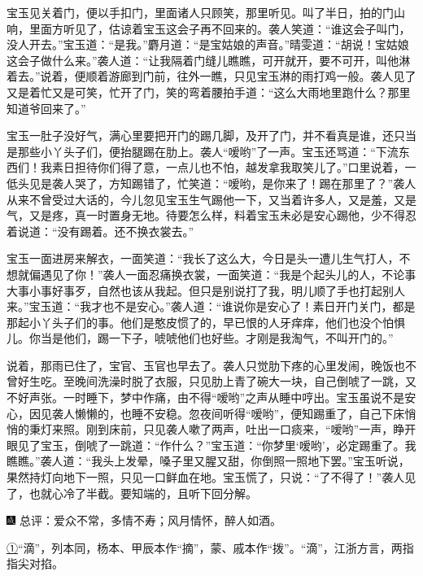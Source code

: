 宝玉见关着门，便以手扣门，里面诸人只顾笑，那里听见。叫了半日，拍的门山响，里面方听见了，估谅着宝玉这会子再不回来的。袭人笑道：``谁这会子叫门，没人开去。''宝玉道：``是我。''麝月道：``是宝姑娘的声音。''晴雯道：``胡说！宝姑娘这会子做什么来。''袭人道：``让我隔着门缝儿瞧瞧，可开就开，要不可开，叫他淋着去。''说着，便顺着游廊到门前，往外一瞧，只见宝玉淋的雨打鸡一般。袭人见了又是着忙又是可笑，忙开了门，笑的弯着腰拍手道：``这么大雨地里跑什么？那里知道爷回来了。''

宝玉一肚子没好气，满心里要把开门的踢几脚，及开了门，并不看真是谁，还只当是那些小丫头子们，便抬腿踢在肋上。袭人``嗳哟''了一声。宝玉还骂道：``下流东西们！我素日担待你们得了意，一点儿也不怕，越发拿我取笑儿了。''口里说着，一低头见是袭人哭了，方知踢错了，忙笑道：``嗳哟，是你来了！踢在那里了？''袭人从来不曾受过大话的，今儿忽见宝玉生气踢他一下，又当着许多人，又是羞，又是气，又是疼，真一时置身无地。待要怎么样，料着宝玉未必是安心踢他，少不得忍着说道：``没有踢着。还不换衣裳去。''

宝玉一面进房来解衣，一面笑道：``我长了这么大，今日是头一遭儿生气打人，不想就偏遇见了你！''袭人一面忍痛换衣裳，一面笑道：``我是个起头儿的人，不论事大事小事好事歹，自然也该从我起。但只是别说打了我，明儿顺了手也打起别人来。''宝玉道：``我才也不是安心。''袭人道：``谁说你是安心了！素日开门关门，都是那起小丫头子们的事。他们是憨皮惯了的，早已恨的人牙痒痒，他们也没个怕惧儿。你当是他们，踢一下子，唬唬他们也好些。才刚是我淘气，不叫开门的。''

说着，那雨已住了，宝官、玉官也早去了。袭人只觉肋下疼的心里发闹，晚饭也不曾好生吃。至晚间洗澡时脱了衣服，只见肋上青了碗大一块，自己倒唬了一跳，又不好声张。一时睡下，梦中作痛，由不得``嗳哟''之声从睡中哼出。宝玉虽说不是安心，因见袭人懒懒的，也睡不安稳。忽夜间听得``嗳哟''，便知踢重了，自己下床悄悄的秉灯来照。刚到床前，只见袭人嗽了两声，吐出一口痰来，``嗳哟''一声，睁开眼见了宝玉，倒唬了一跳道：``作什么？''宝玉道：``你梦里`嗳哟'，必定踢重了。我瞧瞧。''袭人道：``我头上发晕，嗓子里又腥又甜，你倒照一照地下罢。''宝玉听说，果然持灯向地下一照，只见一口鲜血在地。宝玉慌了，只说：``了不得了！''袭人见了，也就心冷了半截。要知端的，且听下回分解。

{\includegraphics[width=3mm]{../Images/00005}  \kaishu 总评：爱众不常，多情不寿；风月情怀，醉人如酒。}

{\href{../Text/part0034_split_000.html\#navto_1_a}{①}``滴''，列本同，杨本、甲辰本作``摘''，蒙、戚本作``拨''。``滴''，江浙方言，两指指尖对掐。}
